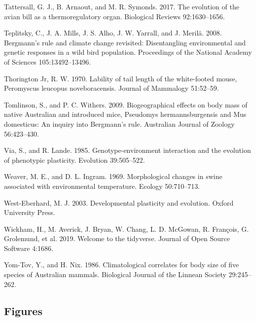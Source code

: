 \documentclass[]{article}
\begin{document}
\leavevmode\hypertarget{ref-Tattersall2017}{}%
Tattersall, G. J., B. Arnaout, and M. R. Symonds. 2017. The evolution of
the avian bill as a thermoregulatory organ. Biological Reviews
92:1630--1656.

\leavevmode\hypertarget{ref-Teplitsky2008}{}%
Teplitsky, C., J. A. Mills, J. S. Alho, J. W. Yarrall, and J. Merilä.
2008. Bergmann's rule and climate change revisited: Disentangling
environmental and genetic responses in a wild bird population.
Proceedings of the National Academy of Sciences 105:13492--13496.

\leavevmode\hypertarget{ref-Thorington1970}{}%
Thorington Jr, R. W. 1970. Lability of tail length of the white-footed
mouse, Peromyscus leucopus noveboracensis. Journal of Mammalogy
51:52--59.

\leavevmode\hypertarget{ref-Tomlinson2009}{}%
Tomlinson, S., and P. C. Withers. 2009. Biogeographical effects on body
mass of native Australian and introduced mice, Pseudomys
hermannsburgensis and Mus domesticus: An inquiry into Bergmann's rule.
Australian Journal of Zoology 56:423--430.

\leavevmode\hypertarget{ref-Via1985}{}%
Via, S., and R. Lande. 1985. Genotype-environment interaction and the
evolution of phenotypic plasticity. Evolution 39:505--522.

\leavevmode\hypertarget{ref-Weaver1969}{}%
Weaver, M. E., and D. L. Ingram. 1969. Morphological changes in swine
associated with environmental temperature. Ecology 50:710--713.

\leavevmode\hypertarget{ref-West-Eberhard2003}{}%
West-Eberhard, M. J. 2003. Developmental plasticity and evolution.
Oxford University Press.

\leavevmode\hypertarget{ref-Wickham2019}{}%
Wickham, H., M. Averick, J. Bryan, W. Chang, L. D. McGowan, R. François,
G. Grolemund, et al. 2019. Welcome to the tidyverse. Journal of Open
Source Software 4:1686.

\leavevmode\hypertarget{ref-Yom-Tov1986}{}%
Yom-Tov, Y., and H. Nix. 1986. Climatological correlates for body size
of five species of Australian mammals. Biological Journal of the Linnean
Society 29:245--262.

\setlength{\parindent}{0in}
\setlength{\leftskip}{0in}

\newpage

\hypertarget{figures}{%
\subsection{Figures}\label{figures}}
\end{document}
